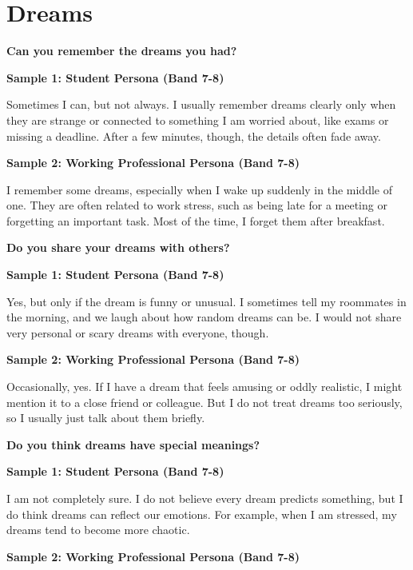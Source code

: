 \newpage

\section{Dreams}
\begin{ieltsquestion}
\textbf{Can you remember the dreams you had?}
\end{ieltsquestion}
\textbf{Sample 1: Student Persona (Band 7-8)}

Sometimes I can, but not always. I usually remember dreams clearly only when they are strange or connected to something I am worried about, like exams or missing a deadline. After a few minutes, though, the details often fade away.

\textbf{Sample 2: Working Professional Persona (Band 7-8)}

I remember some dreams, especially when I wake up suddenly in the middle of one. They are often related to work stress, such as being late for a meeting or forgetting an important task. Most of the time, I forget them after breakfast.

\separator

\begin{ieltsquestion}
\textbf{Do you share your dreams with others?}
\end{ieltsquestion}
\textbf{Sample 1: Student Persona (Band 7-8)}

Yes, but only if the dream is funny or unusual. I sometimes tell my roommates in the morning, and we laugh about how random dreams can be. I would not share very personal or scary dreams with everyone, though.

\textbf{Sample 2: Working Professional Persona (Band 7-8)}

Occasionally, yes. If I have a dream that feels amusing or oddly realistic, I might mention it to a close friend or colleague. But I do not treat dreams too seriously, so I usually just talk about them briefly.

\separator

\begin{ieltsquestion}
\textbf{Do you think dreams have special meanings?}
\end{ieltsquestion}
\textbf{Sample 1: Student Persona (Band 7-8)}

I am not completely sure. I do not believe every dream predicts something, but I do think dreams can reflect our emotions. For example, when I am stressed, my dreams tend to become more chaotic.

\textbf{Sample 2: Working Professional Persona (Band 7-8)}

